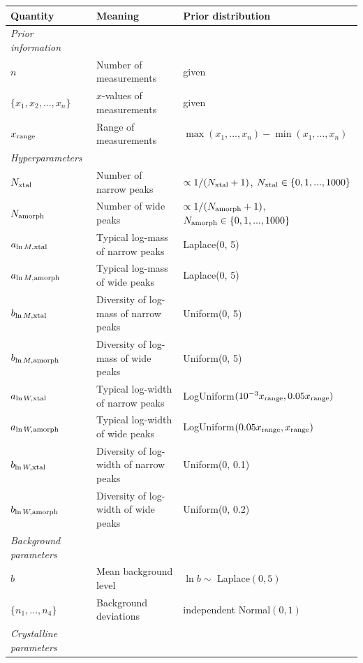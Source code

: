 \documentclass[review]{elsarticle}
\newcommand{\x}{x}
\newcommand{\changed}{\color{blue}}
\begin{document}
\begin{table}[!ht]
\footnotesize
\centering
\begin{tabular}{|lll|}
\hline
{\bf Quantity}      &   {\bf Meaning}   &  {\bf Prior distribution}\\
\hline
{\em Prior information}&&\\
$n$ & Number of measurements & given\\
$\{\x_1, \x_2, ..., \x_n\}$  & $\x$-values of measurements & given \\
{\changed $x_{\rm range}$} & {\changed Range of measurements} & {\changed $\max(x_1, ..., x_n) - \min(x_1, ..., x_n)$} \\
\hline
{\em Hyperparameters} & &\\
$N_{\rm xtal}$   &   Number of narrow peaks    &  $\propto 1/(N_{\rm xtal}+1)$, $N_{\rm xtal} \in \{0, 1, ..., 1000\}$ \\
$N_{\rm amorph}$   &   Number of wide peaks    &  $\propto 1/(N_{\rm amorph}+1)$,
 {\changed $N_{\rm amorph} \in\{0, 1, ..., 1000\}$} \\
{\changed $a_{\ln M, \rm xtal}$} & Typical {\changed log-mass} of narrow peaks & Laplace(0, 5)\\
{\changed $a_{\ln M, \rm amorph}$} & Typical {\changed log-mass} of wide peaks & Laplace(0, 5)\\
{\changed $b_{\ln M, \rm xtal}$} & Diversity of {\changed log-mass} of narrow peaks & Uniform(0, 5)\\
{\changed $b_{\ln M, \rm amorph}$} & Diversity of {\changed log-mass} of wide peaks & Uniform(0, 5)\\
$a_{\ln W, \rm xtal}$ & Typical log-width of narrow peaks & LogUniform$(10^{-3}x_{\rm range}, 0.05x_{\rm range})$\\
$a_{\ln W, \rm amorph}$ & Typical log-width of wide peaks & LogUniform$(0.05x_{\rm range}, x_{\rm range})$\\
$b_{\ln W, \rm xtal}$ & Diversity of log-width of narrow peaks & Uniform(0, 0.1)\\
$b_{\ln W, \rm amorph}$ & Diversity of log-width of wide peaks & Uniform(0, 0.2)\\
\hline
{\em Background parameters}&&\\
$b$       & Mean background level       & $\ln b \sim $ Laplace$(0, 5)$\\
$\{n_1, ..., n_4\}$  & Background deviations & independent Normal$(0,1)$\\
\hline
{\em Crystalline parameters}&&\\

\end{tabular}
\end{table}
\end{document}
